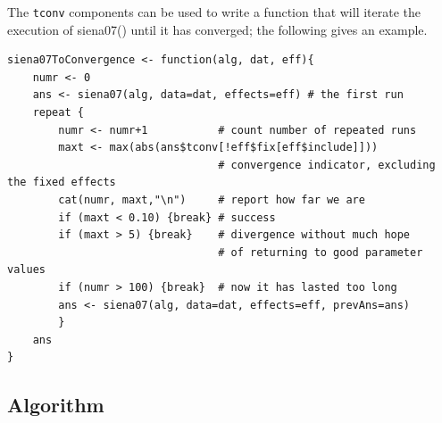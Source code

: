 \documentclass[a4paper,fleqn,11pt]{article}
\newcommand{\+}{\, + \,}
\newcommand{\sfn}[1]{\textsf{#1}}
\begin{document}
The \texttt{tconv} components can be used to write a function
that will iterate the execution of \sfn{siena07()} until it has
converged; the following gives an example.

\begin{verbatim}
siena07ToConvergence <- function(alg, dat, eff){
	numr <- 0			
	ans <- siena07(alg, data=dat, effects=eff) # the first run
	repeat {
    	numr <- numr+1           # count number of repeated runs
    	maxt <- max(abs(ans$tconv[!eff$fix[eff$include]]))	
                                 # convergence indicator, excluding the fixed effects	
    	cat(numr, maxt,"\n")     # report how far we are
    	if (maxt < 0.10) {break} # success
    	if (maxt > 5) {break}    # divergence without much hope
                                 # of returning to good parameter values
    	if (numr > 100) {break}  # now it has lasted too long
    	ans <- siena07(alg, data=dat, effects=eff, prevAns=ans)
    	}	
	ans
}
\end{verbatim}

\subsection{Algorithm}
\label{S_algorithm}
\end{document}
